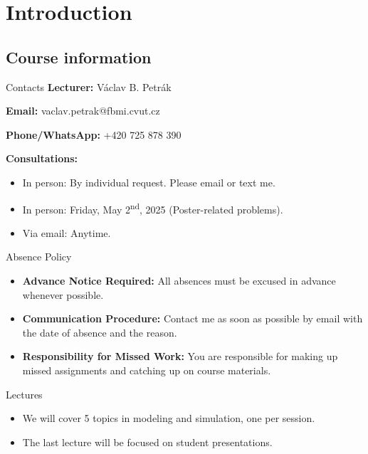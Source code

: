 \section{Introduction}
\subsection{Course information}

\begin{frame}{Contacts}
    \textbf{Lecturer:} Václav B. Petrák  

    \textbf{Email:} vaclav.petrak@fbmi.cvut.cz  

    \textbf{Phone/WhatsApp:} +420 725 878 390

    \vspace{1em}
    \textbf{Consultations:} 
    \begin{itemize}
        \item In person: By individual request. Please email or text me.
        \item In person: Friday, May 2\textsuperscript{nd}, 2025 (Poster-related problems).
        \item Via email: Anytime.
    \end{itemize}
\end{frame}

\begin{frame}{Absence Policy}
    \begin{itemize}
        \item \textbf{Advance Notice Required:} All absences must be excused in advance whenever possible.
        \item \textbf{Communication Procedure:} Contact me as soon as possible by email with the date of absence and the reason.
        \item \textbf{Responsibility for Missed Work:} You are responsible for making up missed assignments and catching up on course materials.  
    \end{itemize}
\end{frame}

\begin{frame}{Lectures}
    \Large
    \begin{itemize}
        \item We will cover 5 topics in modeling and simulation, one per session.
        \item The last lecture will be focused on student presentations. 
    \end{itemize}
\end{frame}

